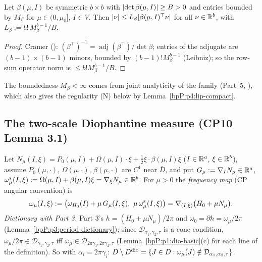 \begin{lemma}\label{bpP:p4:beta-inverse}
Let $\beta(\mu,I)$ be symmetric $b\times b$ with $\lvert \det\beta(\mu,I)\rvert\ge B>0$ and entries bounded by $M_\beta$ for $\mu\in(0,\mu_0]$, $I\in V$. Then $\lvert \nu\rvert\le L_\beta\lvert \beta(\mu,I)^{\top}\nu\rvert$ for all $\nu\in\mathbb{R}^b$, with $L_\beta:=b!\,M_\beta^{b-1}/B$.
\end{lemma}
\begin{proof}
Cramer (): $(\beta^\top)^{-1}=\operatorname{adj}(\beta^\top)/\det\beta$; entries of the adjugate are $(b-1)\times(b-1)$ minors, bounded by $(b-1)!M_\beta^{b-1}$ (Leibniz); so the row-sum operator norm is $\le b!M_\beta^{b-1}/B$.
\end{proof}
The boundedness $M_\beta<\infty$ comes from joint analyticity of the family (Part~5, ), which also gives the regularity (N) below by Lemma~\ref{bpP:p4:lip-compact}.

\subsection{The two-scale Diophantine measure (CP10 Lemma 3.1)}\label{bpP:p4:s-dio}

\begin{definition}\label{bpP:p4:freq}
Let $N_\mu(I,\xi)=P_0(\mu,I)+\Omega(\mu,I)\cdot\xi+\tfrac12\xi\cdot\beta(\mu,I)\xi$ ($I\in\mathbb{R}^a$, $\xi\in\mathbb{R}^b$), assume $P_0(\mu,\cdot)$, $\Omega(\mu,\cdot)$, $\beta(\mu,\cdot)$ are $C^1$ near $\bar D$, and put $G_\mu:=\nabla_IN_\mu\in\mathbb{R}^a$, $\omega^{\rm s}_\mu(I,\xi):=\Omega(\mu,I)+\beta(\mu,I)\xi=\nabla_\xi N_\mu\in\mathbb{R}^b$. For $\mu>0$ the \emph{frequency map} (CP angular convention) is
\[\omega_\mu(I,\xi):=\bigl(\omega_{H_0}(I)+\mu\,G_\mu(I,\xi),\ \mu\,\omega^{\rm s}_\mu(I,\xi)\bigr)=\nabla_{(I,\xi)}\bigl(H_0+\mu N_\mu\bigr).\]
\emph{Dictionary with Part 3.} Part 3's $h=(H_0+\mu N_\mu)/2\pi$ and $\omega_0=\partial h=\omega_\mu/2\pi$ (Lemma~\ref{bpP:p3:period-dictionary}); since $\mathcal D_{\gamma_1,\gamma_2,\tau}$ is a cone condition, $\omega_\mu/2\pi\in\mathcal D_{\gamma_1,\gamma_2,\tau}$ iff $\omega_\mu\in\mathcal D_{2\pi\gamma_1,2\pi\gamma_2,\tau}$ (Lemma~\ref{bpP:p1:dio-basic}(c) for each line of the definition). So with $\alpha_i=2\pi\gamma_i$: $D\setminus D^{\rm dio}=\{J\in D:\omega_\mu(J)\notin\mathcal D_{\alpha_1,\alpha_2,\tau}\}$.
\end{definition}

